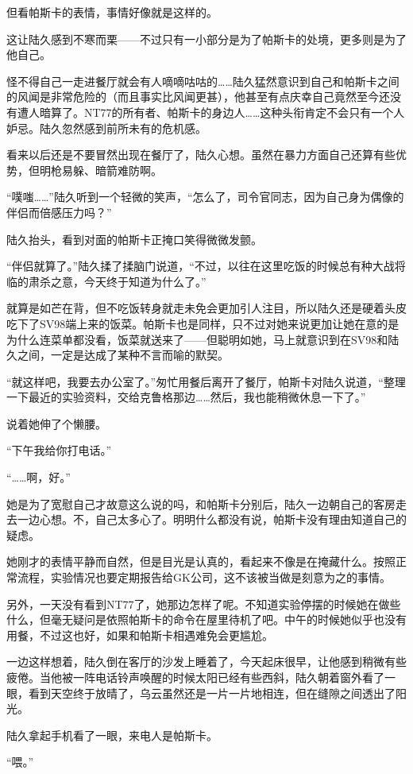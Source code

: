 但看帕斯卡的表情，事情好像就是这样的。

这让陆久感到不寒而栗——不过只有一小部分是为了帕斯卡的处境，更多则是为了他自己。

怪不得自己一走进餐厅就会有人嘀嘀咕咕的……陆久猛然意识到自己和帕斯卡之间的风闻是非常危险的（而且事实比风闻更甚），他甚至有点庆幸自己竟然至今还没有遭人暗算了。NT77的所有者、帕斯卡的身边人……这种头衔肯定不会只有一个人妒忌。陆久忽然感到前所未有的危机感。

看来以后还是不要冒然出现在餐厅了，陆久心想。虽然在暴力方面自己还算有些优势，但明枪易躲、暗箭难防啊。

“噗嗤……”陆久听到一个轻微的笑声，“怎么了，司令官同志，因为自己身为偶像的伴侣而倍感压力吗？”

陆久抬头，看到对面的帕斯卡正掩口笑得微微发颤。

“伴侣就算了。”陆久揉了揉脑门说道，“不过，以往在这里吃饭的时候总有种大战将临的肃杀之意，今天终于知道为什么了。”

就算是如芒在背，但不吃饭转身就走未免会更加引人注目，所以陆久还是硬着头皮吃下了SV98端上来的饭菜。帕斯卡也是同样，只不过对她来说更加让她在意的是为什么连菜单都没看，饭菜就送来了——但聪明如她，马上就意识到在SV98和陆久之间，一定是达成了某种不言而喻的默契。

“就这样吧，我要去办公室了。”匆忙用餐后离开了餐厅，帕斯卡对陆久说道，“整理一下最近的实验资料，交给克鲁格那边……然后，我也能稍微休息一下了。”

说着她伸了个懒腰。

“下午我给你打电话。”

“……啊，好。”

她是为了宽慰自己才故意这么说的吗，和帕斯卡分别后，陆久一边朝自己的客房走去一边心想。不，自己太多心了。明明什么都没有说，帕斯卡没有理由知道自己的疑虑。

她刚才的表情平静而自然，但是目光是认真的，看起来不像是在掩藏什么。按照正常流程，实验情况也要定期报告给GK公司，这不该被当做是刻意为之的事情。

另外，一天没有看到NT77了，她那边怎样了呢。不知道实验停摆的时候她在做些什么，但毫无疑问是依照帕斯卡的命令在屋里待机了吧。中午的时候她似乎也没有用餐，不过这也好，如果和帕斯卡相遇难免会更尴尬。

一边这样想着，陆久倒在客厅的沙发上睡着了，今天起床很早，让他感到稍微有些疲倦。当他被一阵电话铃声唤醒的时候太阳已经有些西斜，陆久朝着窗外看了一眼，看到天空终于放晴了，乌云虽然还是一片一片地相连，但在缝隙之间透出了阳光。

陆久拿起手机看了一眼，来电人是帕斯卡。

“喂。”

